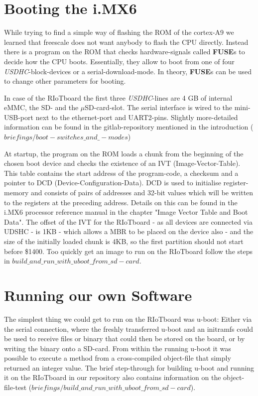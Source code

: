 \section{Booting the i.MX6}

While trying to find a simple way of flashing the ROM of the cortex-A9 we learned that
freescale does not want anybody to flash the CPU directly. Instead there is a program on
the ROM that checks hardware-signals called \textbf{FUSE}s to decide how the CPU boots.
Essentially, they allow to boot from one of four \textit{USDHC}-block-devices or a
serial-download-mode. In theory, \textbf{FUSE}s can be used to change other
parameters for booting.

In case of the RIoTboard the first three \textit{USDHC}-lines are 4 GB of internal eMMC,
the SD- and the $\mu$SD-card-slot. The serial interface is wired to the mini-USB-port
next to the ethernet-port and UART2-pins.
Slightly more-detailed information can be found in the gitlab-repository mentioned in
the introduction (\textit{$briefings/boot-switches\_and\_-modes$})

At startup, the program on the ROM loads a chunk from the beginning of the chosen boot
device and checks the existence of an IVT (Image-Vector-Table). This table contains the
start address of the program-code, a checksum and a pointer to DCD
(Device-Configuration-Data). DCD is used to initialise register-memory and consists of
pairs of addresses and 32-bit values which will be written to the registers at the
preceding address. Details on this can be found in the i.MX6 processor reference manual
in the chapter "Image Vector Table and Boot Data".
The offset of the IVT for the RIoTboard - as all devices are connected via UDSHC - is 1KB
 - which allows a MBR to be placed on the device also - and the size of the initially
loaded chunk is 4KB, so the first partition should not start before \$1400. Too quickly
get an image to run on the RIoTboard follow the steps in
\textit{$build\_and\_run\_with\_uboot\_from\_sd-card$}.

\section{Running our own Software}

The simplest thing we could get to run on the RIoTboard was u-boot: Either via the serial
connection, where the freshly transferred u-boot and an initramfs could be used to
receive files or binary that could then be stored on the board, or by writing the binary
onto a SD-card. From within the running u-boot it was possible to execute a method from
a cross-compiled object-file that simply returned an integer value.
The brief step-through for building u-boot and running it on the RIoTboard in our
repository also contains information on the object-file-test
(\textit{$briefings/build\_and\_run\_with\_uboot\_from\_sd-card$}).

